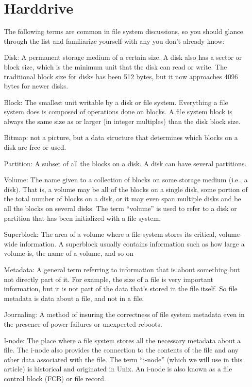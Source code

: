 \section{Harddrive}



The following terms are common in file system discussions, so you should glance through the list and familiarize yourself with any you don't already know:

Disk: A permanent storage medium of a certain size. A disk also has a sector or block size, which is the minimum unit that the disk can read or write. The traditional block size for disks has been 512 bytes, but it now approaches 4096 bytes for newer disks.

Block: The smallest unit writable by a disk or ﬁle system. Everything a ﬁle system does is composed of operations done on blocks. A ﬁle system block is always the same size as or larger (in integer multiples) than the disk block size.

Bitmap: not a picture, but a data structure that determines which blocks on a disk are free or used.

Partition: A subset of all the blocks on a disk. A disk can have several partitions.

Volume: The name given to a collection of blocks on some storage medium (i.e., a disk). That is, a volume may be all of the blocks on a single disk, some portion of the total number of blocks on a disk, or it may even span multiple disks and be all the blocks on several disks. The term “volume” is used to refer to a disk or partition that has been initialized with a ﬁle system.

Superblock: The area of a volume where a ﬁle system stores its critical, volume-wide information. A superblock usually contains information such as how large a volume is, the name of a volume, and so on

Metadata: A general term referring to information that is about something but not directly part of it. For example, the size of a ﬁle is very important information, but it is not part of the data that's stored in the file itself. So file metadata is data about a file, and not in a file.

Journaling: A method of insuring the correctness of ﬁle system metadata even in the presence of power failures or unexpected reboots.

I-node: The place where a ﬁle system stores all the necessary metadata about a ﬁle. The i-node also provides the connection to the contents of the ﬁle and any other data associated with the ﬁle. The term “i-node” (which we will use in this article) is historical and originated in Unix. An i-node is also known as a ﬁle control block (FCB) or ﬁle record.

